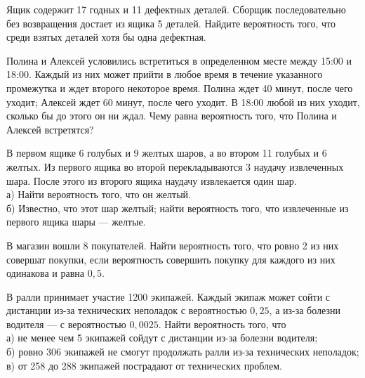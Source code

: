 \newpage\setcounter{zad}{0}



\begin{zkrW}{20}\noindent 
	Ящик содержит 17 годных и 11 дефектных деталей. Сборщик последовательно без возвращения достает из ящика 5 деталей. Найдите вероятность того, что среди взятых деталей хотя бы одна дефектная.
 
\end{zkrW}

\begin{zkrW}{20}\noindent 
	Полина и Алексей условились встретиться в определенном месте между 15:00 и 18:00. Каждый из них может прийти в любое время в течение указанного промежутка и ждет второго некоторое время. Полина ждет 40 минут, после чего уходит; Алексей ждет 60 минут, после чего уходит. В 18:00 любой из них уходит, сколько бы до этого он ни ждал. Чему равна вероятность того, что Полина и Алексей встретятся?
 
\end{zkrW}

\begin{zkrW}{20}\noindent 
	В первом ящике 6 голубых и 9 желтых шаров, а во втором 11 голубых и 6 желтых. Из первого ящика во второй перекладываются 3 наудачу извлеченных шара. После этого из второго ящика наудачу извлекается один шар. \\ \indent а) Найти вероятность того, что он желтый. \\ \indent б) Известно, что этот шар желтый; найти вероятность того, что извлеченные из первого ящика шары --- желтые.
 
\end{zkrW}

\begin{zkrW}{20}\noindent 
	В магазин вошли 8 покупателей. Найти вероятность того, что ровно 2 из них совершат покупки, если вероятность совершить покупку для каждого из них одинакова и равна $0{,}5$.
 
\end{zkrW}

\begin{zkrW}{20}\noindent 
	В ралли принимает участие 1200 экипажей. Каждый экипаж может сойти с дистанции из-за технических неполадок с вероятностью $0{,}25$, а из-за болезни водителя --- с вероятностью $0{,}0025$. Найти вероятность того, что \\ \indent а) не менее чем 5 экипажей сойдут с дистанции из-за болезни водителя; \\ \indent б) ровно 306 экипажей не смогут продолжать ралли из-за технических неполадок; \\ \indent в) от 258 до 288 экипажей пострадают от технических проблем.
 
\end{zkrW}

